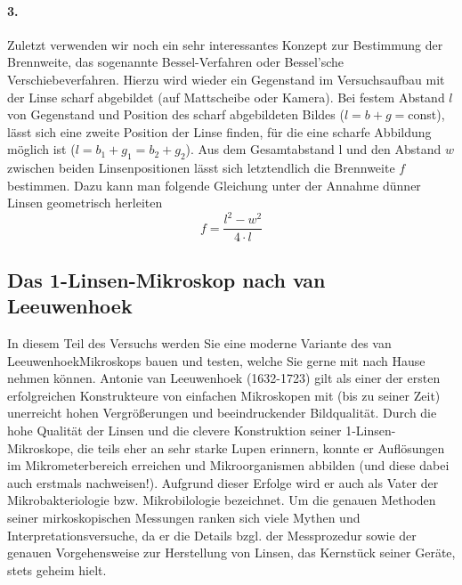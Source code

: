 \documentclass[ngerman]{scrartcl}
\begin{document}
\paragraph{3.} Zuletzt verwenden wir noch ein sehr interessantes Konzept zur Bestimmung der Brennweite, das sogenannte Bessel-Verfahren oder Bessel'sche Verschiebeverfahren. Hierzu wird wieder ein Gegenstand im Versuchsaufbau mit der Linse scharf abgebildet (auf Mattscheibe oder Kamera). Bei festem Abstand $l$ von Gegenstand und Position des scharf abgebildeten Bildes ($l = b + g = $const), lässt sich eine zweite Position der Linse finden, für die eine scharfe Abbildung möglich ist ($l = b_1 + g_1 = b_2 + g_2$). Aus dem Gesamtabstand l und den Abstand $w$ zwischen beiden Linsenpositionen lässt sich letztendlich die Brennweite $f$ bestimmen. Dazu kann man folgende Gleichung unter der Annahme dünner Linsen geometrisch herleiten
\begin{equation}
    \label{eq:bessel}
    f = \frac{l^2 - w^2}{4\cdot l}
\end{equation}

\subsection{Das 1-Linsen-Mikroskop nach van Leeuwenhoek}
\label{subsec:1_linsen_mikroskop_Grundlagen}
In diesem Teil des Versuchs werden Sie eine moderne Variante des van LeeuwenhoekMikroskops bauen und testen, welche Sie gerne mit nach Hause nehmen können. Antonie van Leeuwenhoek (1632-1723) gilt als einer der ersten erfolgreichen Konstrukteure von einfachen Mikroskopen mit (bis zu seiner Zeit) unerreicht hohen Vergrößerungen und beeindruckender Bildqualität. Durch die hohe Qualität der Linsen und die clevere Konstruktion seiner 1-Linsen-Mikroskope, die teils eher an sehr starke Lupen erinnern, konnte er Auflösungen im Mikrometerbereich erreichen und Mikroorganismen abbilden (und diese dabei auch erstmals nachweisen!). Aufgrund dieser Erfolge wird er auch als Vater der Mikrobakteriologie bzw. Mikrobilologie bezeichnet. Um die genauen Methoden seiner mirkoskopischen Messungen ranken sich viele Mythen und Interpretationsversuche, da er die Details bzgl. der Messprozedur sowie der genauen Vorgehensweise zur Herstellung von Linsen, das Kernstück seiner Geräte, stets geheim hielt.
\end{document}
